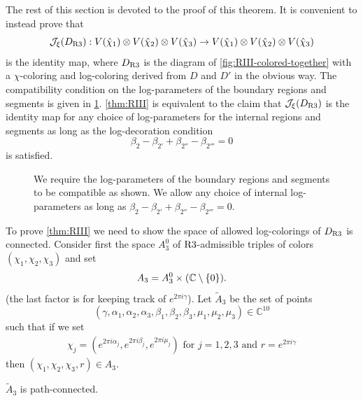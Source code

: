 \documentclass{sl2ams}
\numberwithin{equation}{section}
\newcommand{\CC}{\mathbb{C}}
\newcommand{\J}{\mathcal{J}}
\begin{document}
The rest of this section is devoted to the proof of this theorem.
It is convenient to instead prove that
\[
  \J_{\xi}(D_{\RIII}) : 
  \rep{\hat{\chi}_{1}}
  \otimes
  \rep{\hat{\chi}_{2}}
  \otimes
  \rep{\hat{\chi}_{3}}
  \to
  \rep{\hat{\chi}_{1}}
  \otimes
  \rep{\hat{\chi}_{2}}
  \otimes
  \rep{\hat{\chi}_{3}}
\]
is the identity map, where \(D_{\operatorname{R3}}\) is the diagram of \cref{fig:RIII-colored-together} with a \(\chi\)-coloring and log-coloring derived from \(D\) and \(D'\) in the obvious way.
The compatibility condition on the log-parameters of the boundary regions and segments is given in \cref{fig:RIII-log-parameters}.
\cref{thm:RIII} is equivalent to the claim that \(\J_{\xi}(D_{\RIII})\) is the identity map for any choice of log-parameters for the internal regions and segments as long as the log-decoration condition
\begin{equation}
  \label{eq:RIII beta condition}
  \beta_{2} - \beta_{2'} + \beta_{2''} - \beta_{2'''} = 0
\end{equation}
is satisfied.


\begin{figure}
  \centering
  
  \caption{
    We require the log-parameters of the boundary regions and segments to be compatible as shown.
    We allow any choice of internal log-parameters as long as \(\beta_{2} - \beta_{2'} + \beta_{2''} - \beta_{2'''} = 0\).
  }
  \label{fig:RIII-log-parameters}
\end{figure}

To prove \cref{thm:RIII} we need to show the space of allowed log-colorings of \(D_{\operatorname{R3}}\) is connected.
Consider first the space \(A_{3}^{0}\) of \(\operatorname{R3}\)-admissible triples of colors \((\chi_{1}, \chi_{2}, \chi_{3})\) and set
\[
  A_3 = A_3^0 \times ( \mathbb{C} \setminus \set{0} ).
\]
(the last factor is for keeping track of \(e^{2 \pi i \gamma}\)).
Let \(\widetilde{A}_3\) be the set of points 
\[
  (\gamma, \alpha_1, \alpha_2, \alpha_3, \beta_1, \beta_2, \beta_3, \mu_1, \mu_2, \mu_3)
  \in \CC^{10}
\]
such that if we set
\begin{align*}
  \chi_j =
  \left(
    e^{2\pi i \alpha_{j}}, 
    e^{2\pi i \beta_j},
    e^{2\pi i \mu_j}
  \right)
  \text{ for \(j = 1, 2, 3\) and }
  r = e^{2\pi i \gamma}
\end{align*}
then \((\chi_1, \chi_2, \chi_3, r) \in A_3\).

\begin{lemma}
  \(\widetilde{A}_{3}\) is path-connected.
\end{lemma}
\end{document}
